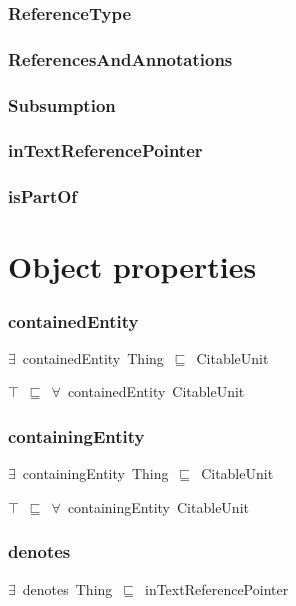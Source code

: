 \documentclass{article}
\begin{document}
\subsubsection*{ReferenceType}

\subsubsection*{ReferencesAndAnnotations}

\subsubsection*{Subsumption}

\subsubsection*{inTextReferencePointer}

\subsubsection*{isPartOf}

\section*{Object properties}\subsubsection*{containedEntity}

\ensuremath{\exists}~containedEntity~Thing~\ensuremath{\sqsubseteq}~CitableUnit

\ensuremath{\top}~\ensuremath{\sqsubseteq}~\ensuremath{\forall}~containedEntity~CitableUnit

\subsubsection*{containingEntity}

\ensuremath{\exists}~containingEntity~Thing~\ensuremath{\sqsubseteq}~CitableUnit

\ensuremath{\top}~\ensuremath{\sqsubseteq}~\ensuremath{\forall}~containingEntity~CitableUnit

\subsubsection*{denotes}

\ensuremath{\exists}~denotes~Thing~\ensuremath{\sqsubseteq}~inTextReferencePointer
\end{document}
